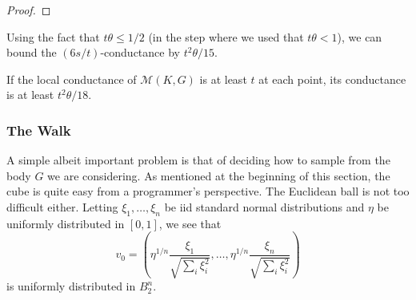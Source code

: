 \begin{proof}
\end{proof}

Using the fact that $t\theta\leq 1/2$ (in the step where we used that $t\theta<1$), we can bound the $(6s/t)$-conductance by $t^2\theta/15$.

\begin{corollary}
	\label{cor to bound conductance}
	If the local conductance of $\mathcal{M}(K,G)$ is at least $t$ at each point, its conductance is at least $t^2\theta/18$.
\end{corollary}

\subsubsection{The Walk}
\label{the walk}

A simple albeit important problem is that of deciding how to sample from the body $G$ we are considering. As mentioned at the beginning of this section, the cube is quite easy from a programmer's perspective. The Euclidean ball is not too difficult either. Letting $\xi_1,\ldots,\xi_n$ be iid standard normal distributions and $\eta$ be uniformly distributed in $[0,1]$, we see that
\[ v_0 = \left( \eta^{1/n} \frac{\xi_1}{\sqrt{\sum_i \xi_i^2}}, \ldots, \eta^{1/n} \frac{\xi_n}{\sqrt{\sum_i \xi_i^2}} \right) \]
is uniformly distributed in $B_2^n$.\\

